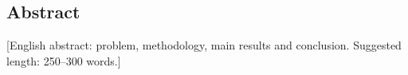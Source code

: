 
\begin{otherlanguage}{english}
\chapter*{Abstract}

[English abstract: problem, methodology, main results and conclusion.
Suggested length: 250--300 words.]

\clearpage
\end{otherlanguage}
